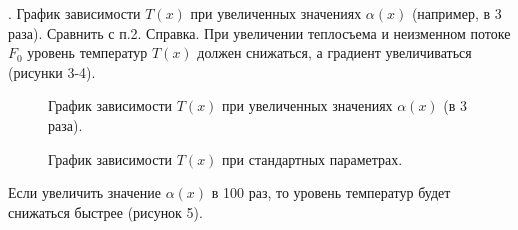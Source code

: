 \documentclass[a4paper,14pt]{article}
\begin{document}
. График зависимости $T(x)$ при увеличенных значениях $\alpha(x)$ (например, в 3 раза). Сравнить с п.2.
Справка. При увеличении теплосъема и неизменном потоке $F_0$ уровень температур $T(x)$ должен снижаться, а градиент  увеличиваться (рисунки 3-4).

\begin{figure}[!h]
	\caption{График зависимости $T(x)$ при увеличенных значениях $\alpha(x)$ (в 3 раза).}
	\label{fig:image}
\end{figure}

\begin{figure}[!h]
	\caption{График зависимости $T(x)$ при стандартных параметрах.}
	\label{fig:image}
\end{figure}

Если увеличить значение $\alpha(x)$ в 100 раз, то уровень температур будет снижаться быстрее (рисунок 5).
\end{document}
